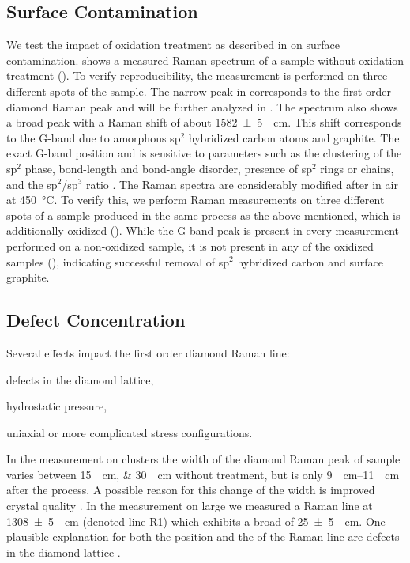 			\subsection{Surface Contamination}\label{subsec::raman_surface_contamination}

				We test the impact of oxidation treatment as described in  on surface contamination.
				 shows a measured Raman spectrum of a sample without oxidation treatment (\insituSn).
				To verify reproducibility, the measurement is performed on three different spots of the sample.
				The narrow peak in  corresponds to the first order diamond Raman peak and will be further analyzed in .
				The spectrum also shows a broad peak with a Raman shift of about \SI[separate-uncertainty]{1582+-5}{\per\centi\meter}.
				This shift corresponds to the G-band due to amorphous sp$^2$ hybridized carbon atoms and graphite.
				The exact G-band position and \lw is sensitive to parameters such as the clustering of the sp$^2$ phase, bond-length and bond-angle disorder, presence of sp$^2$ rings or chains, and the sp$^2$/sp$^3$ ratio \cite{ferrari2004raman}.
				The \nd Raman spectra are considerably modified after \ox in air at \SI{450}{\degreeCelsius}.
				To verify this, we perform Raman measurements on three different spots of a sample produced in the same process as the above mentioned, which is additionally oxidized (\insituSo).
				While the G-band peak is present in every measurement performed on a non-oxidized sample, it is not present in any of the oxidized samples (), indicating successful removal of sp$^2$ hybridized carbon and surface graphite.

			\subsection{Defect Concentration}\label{subsec::raman_defect_concentration}
				
				Several effects impact the first order diamond Raman line:
				\begin{enumerate*}
					\item defects in the diamond lattice,
					\item hydrostatic pressure,
					\item uniaxial or more complicated stress configurations.
				\end{enumerate*}
				In the measurement on \nd clusters the width of the diamond Raman peak of sample \insituS varies between \SIlist{15; 30}{\per\centi\meter} without \ox treatment, but is only \SIrange{9}{11}{\per\centi\meter} after the \ox process.
				A possible reason for this change of the width is improved crystal quality \cite{Prawer2004}.
				In the measurement on large \nds we measured a Raman line at \SI[separate-uncertainty]{1308+-5}{\per\centi\meter} (denoted line R1) which exhibits a broad \lw of \SI[separate-uncertainty]{25+-5}{\per\centi\meter}.
				One plausible explanation for both the position and the \lw of the Raman line are defects in the diamond lattice \cite{Prawer2004}.

